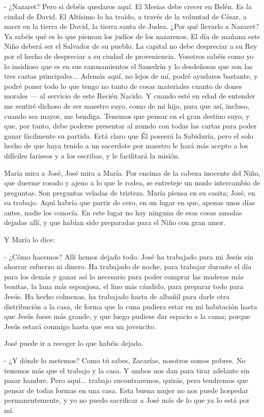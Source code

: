 \documentclass[12pt]{book} %
\begin{document}
- ¿Nazaret? Pero si debéis quedaros aquí. El Mesías debe crecer en Belén. Es la ciudad de David. El Altísimo lo ha traído, a través de la voluntad de César, a nacer en la tierra de David, la tierra santa de Judea. ¿Por qué llevarlo a Nazaret? Ya sabéis qué es lo que piensan los judíos de los nazarenos. El día de mañana este Niño deberá ser el Salvador de su pueblo. La capital no debe despreciar a su Rey por el hecho de despreciar a su ciudad de proveniencia. Vosotros sabéis como yo lo insidioso que es en sus razonamientos el Sanedrín y lo desdeñosas que son las tres castas principales... Además aquí, no lejos de mí, podré ayudaros bastante, y podré poner todo lo que tengo no tanto de cosas materiales cuanto de dones morales — al servicio de este Recién Nacido. Y cuando esté en edad de entender me sentiré dichoso de ser maestro suyo, como de mi hijo, para que así, incluso, cuando sea mayor, me bendiga. Tenemos que pensar en el gran destino suyo, y que, por tanto, debe poderse presentar al mundo con todas las cartas para poder ganar fácilmente su partida. Está claro que Él poseerá la Sabiduría, pero el solo hecho de que haya tenido a un sacerdote por maestro le hará más acepto a los difíciles fariseos y a los escribas, y le facilitará la misión. 

María mira a José, José mira a María. Por encima de la cabeza inocente del Niño, que duerme rosado y ajeno a lo que le rodea, se entreteje un mudo intercambio de preguntas. Son preguntas veladas de tristeza. María piensa en su casita; José, en su trabajo. Aquí habría que partir de cero, en un lugar en que, apenas unos días antes, nadie los conocía. En este lugar no hay ninguna de esas cosas amadas dejadas allí, y que habían sido preparadas para el Niño con gran amor. 

Y María lo dice: 

- ¿Cómo hacemos? Allí hemos dejado todo. José ha trabajado para mi Jesús sin ahorrar esfuerzo ni dinero. Ha trabajado de noche, para trabajar durante el día para los demás y ganar así lo necesario para poder comprar las maderas más bonitas, la lana más esponjosa, el lino más cándido, para preparar todo para Jesús. Ha hecho colmenas, ha trabajado hasta de albañil para darle otra distribución a la casa, de forma que la cuna pudiera estar en mi habitación hasta que Jesús fuese más grande, y que luego pudiese dar espacio a la cama; porque Jesús estará conmigo hasta que sea un jovencito. 

José puede ir a recoger lo que habéis dejado. 

- ¿Y dónde lo metemos? Como tú sabes, Zacarías, nosotros somos pobres. No tenemos más que el trabajo y la casa. Y ambos nos dan para tirar adelante sin pasar hambre. Pero aquí... trabajo encontraremos, quizás, pero tendremos que pensar de todas formas en una casa. Esta buena mujer no nos puede hospedar permanentemente, y yo no puedo sacrificar a José más de lo que ya lo está por mí. 
\end{document}
